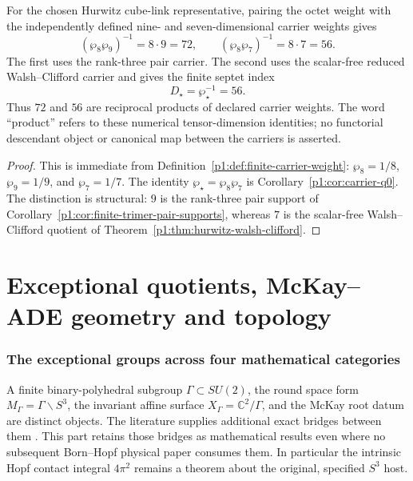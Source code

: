 \documentclass[11pt]{article}
\begin{document}
\begin{corollary}
\label{p1:cor:two-octet-descendants}
For the chosen Hurwitz cube-link representative, pairing the octet weight with
the independently defined nine- and seven-dimensional carrier weights gives
\[
(\wp_8\wp_9)^{-1}=8\cdot9=72,
\qquad
(\wp_8\wp_7)^{-1}=8\cdot7=56.
\]
The first uses the rank-three pair carrier.  The second uses the scalar-free
reduced Walsh--Clifford carrier and gives the finite septet index
\[
D_\star=\wp_\star^{-1}=56.
\]
Thus \(72\) and \(56\) are reciprocal products of declared carrier weights.
The word ``product'' refers to these numerical tensor-dimension identities; no
functorial descendant object or canonical map between the carriers is asserted.
\end{corollary}

\begin{proof}
This is immediate from Definition~\ref{p1:def:finite-carrier-weight}:
\(\wp_8=1/8\), \(\wp_9=1/9\), and \(\wp_7=1/7\).  The identity
\(\wp_\star=\wp_8\wp_7\) is Corollary~\ref{p1:cor:carrier-q0}.  The distinction is
structural: \(9\) is the rank-three pair support of
Corollary~\ref{p1:cor:finite-trimer-pair-supports}, whereas \(7\) is the
scalar-free Walsh--Clifford quotient of Theorem~\ref{p1:thm:hurwitz-walsh-clifford}.
\end{proof}





\part{Exceptional quotients, McKay--ADE geometry and topology}
\section{The exceptional groups across four mathematical categories}
\label{p1b:sec:v12-literature-math}

A finite binary-polyhedral subgroup $\Gamma\subset SU(2)$, the round
space form $M_\Gamma=\Gamma\backslash S^3$, the invariant affine surface
$X_\Gamma=\mathbb C^2/\Gamma$, and the McKay root datum are distinct
objects.  The literature supplies additional exact bridges between them
\cite{Klein1884,McKay1980,Slodowy1980,wolf2011spaces,
BertschGyengeSzendroi2024Kleinian,Suter2007QuantumAffine,
MartinMerinoPoddarRoby2026SpaceForms}.  This part retains those bridges
as mathematical results even where no subsequent Born--Hopf physical
paper consumes them.  In particular the intrinsic Hopf contact integral
$4\pi^2$ remains a theorem about the original, specified $S^3$ host.
\end{document}
